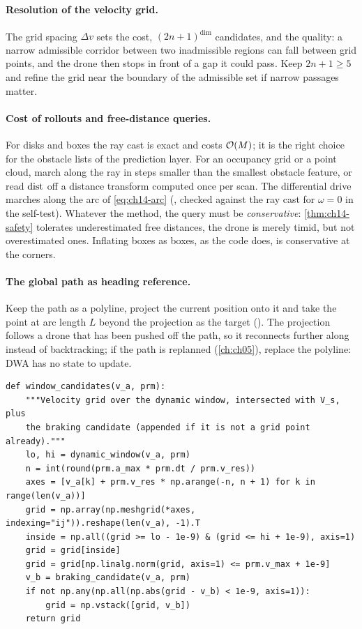 \paragraph{Resolution of the velocity grid.}
The grid spacing $\Delta v$ sets the cost, $(2n+1)^{\dim}$ candidates, and the
quality: a narrow admissible corridor between two inadmissible regions can
fall between grid points, and the drone then stops in front of a gap it could
pass. Keep $2n+1 \ge 5$ and refine the grid near the boundary of the
admissible set if narrow passages matter.

\paragraph{Cost of rollouts and free-distance queries.}
For disks and boxes the ray cast is exact and costs $\mathcal{O}\!\left(M\right)$; it is the
right choice for the obstacle lists of the prediction layer. For an occupancy
grid or a point cloud, march along the ray in steps smaller than the smallest
obstacle feature, or read $\operatorname{dist}$ off a distance transform computed once per
scan. The differential drive marches along the arc of \cref{eq:ch14-arc}
(, checked against the ray cast for
$\omega = 0$ in the self-test). Whatever the method, the query must be
\emph{conservative}: \cref{thm:ch14-safety} tolerates underestimated free
distances, the drone is merely timid, but not overestimated ones. Inflating
boxes as boxes, as the code does, is conservative at the corners.

\paragraph{The global path as heading reference.}
Keep the path as a polyline, project the current position onto it and take
the point at arc length $L$ beyond the projection as the target
(). The projection follows a drone that has been
pushed off the path, so it reconnects further along instead of backtracking;
if the path is replanned (\cref{ch:ch05}), replace the polyline: DWA has no
state to update.

\begin{lstlisting}[caption={The candidate grid over the dynamic window (from
\code{code/ch14\_dwa.py}); the helpers \code{dynamic\_window()} and
\code{braking\_candidate()} implement \cref{eq:ch14-Vd} and
line~\ref{alg:ch14-command:brake} directly.},label={lst:ch14-window}]
def window_candidates(v_a, prm):
    """Velocity grid over the dynamic window, intersected with V_s, plus
    the braking candidate (appended if it is not a grid point already)."""
    lo, hi = dynamic_window(v_a, prm)
    n = int(round(prm.a_max * prm.dt / prm.v_res))
    axes = [v_a[k] + prm.v_res * np.arange(-n, n + 1) for k in range(len(v_a))]
    grid = np.array(np.meshgrid(*axes, indexing="ij")).reshape(len(v_a), -1).T
    inside = np.all((grid >= lo - 1e-9) & (grid <= hi + 1e-9), axis=1)
    grid = grid[inside]
    grid = grid[np.linalg.norm(grid, axis=1) <= prm.v_max + 1e-9]
    v_b = braking_candidate(v_a, prm)
    if not np.any(np.all(np.abs(grid - v_b) < 1e-9, axis=1)):
        grid = np.vstack([grid, v_b])
    return grid
\end{lstlisting}

